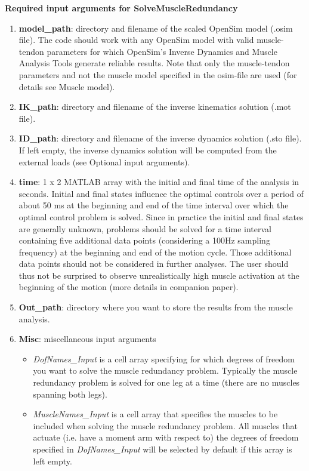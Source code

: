 \documentclass[a4paper,oneside,11pt]{article}
\begin{document}
\textbf{Required input arguments for SolveMuscleRedundancy}
\begin{enumerate}
	\item \textbf{model_path}: directory and filename of the scaled OpenSim model (.osim file). The code should work with any OpenSim model with valid muscle-tendon parameters for which OpenSim's Inverse Dynamics and Muscle Analysis Tools generate reliable results. Note that only the muscle-tendon parameters and not the muscle model specified in the osim-file are used (for details see Muscle model).
	\item \textbf{IK_path}: directory and filename of the inverse kinematics solution (.mot file).
	\item \textbf{ID_path}: directory and filename of the inverse dynamics solution  (.sto file). If left empty, the inverse dynamics solution will be computed from the external loads (see Optional input arguments).
	\item \textbf{time}: 1 x 2 MATLAB array with the initial and final time of the analysis in seconds. Initial and final states influence the optimal controls over a period of about 50 ms at the beginning and end of the time interval over which the optimal control problem is solved. Since in practice the initial and final states are generally unknown, problems should be solved for a time interval containing five additional data points (considering a 100Hz sampling frequency) at the beginning and end of the motion cycle. Those additional data points should not be considered in further analyses. The user should thus not be surprised to observe unrealistically high muscle activation at the beginning of the motion (more details in companion paper).
	
	\item \textbf{Out_path}: directory where you want to store the results from the muscle analysis.
	\item \textbf{Misc}: miscellaneous input arguments
	\begin{itemize}
		\item \textit{DofNames_Input}  is a cell array specifying for which degrees of freedom you want to solve the muscle redundancy problem. Typically the muscle redundancy problem is solved for one leg at a time (there are no muscles spanning both legs).
		\item \textit{MuscleNames_Input} is a cell array that specifies the muscles to be included when solving the muscle redundancy problem. All muscles that actuate (i.e. have a moment arm with respect to) the degrees of freedom specified in \textit{DofNames_Input} will be selected by default if this array is left empty.
	\end{itemize}
\end{enumerate}
\end{document}
